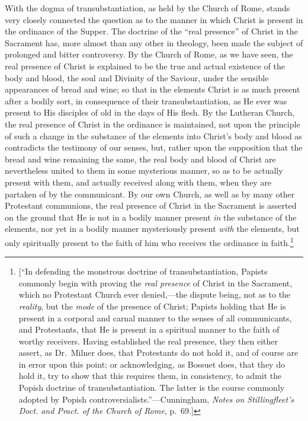 \documentclass[
  english,
]{book}
\begin{document}
With the dogma of transubstantiation, as held by the Church of Rome, stands very closely connected the question as to the manner in which Christ is present in the ordinance of the Supper. The doctrine of the ``real presence'' of Christ in the Sacrament has, more almost than any other in theology, been made the subject of prolonged and bitter controversy. By the Church of Rome, as we have seen, the real presence of Christ is explained to be the true and actual existence of the body and blood, the soul and Divinity of the Saviour, under the sensible appearances of bread and wine; so that in the elements Christ is as much present after a bodily sort, in consequence of their transubstantiation, as He ever was present to His disciples of old in the days of His flesh. By the Lutheran Church, the real presence of Christ in the ordinance is maintained, not upon the principle of such a change in the substance of the elements into Christ's body and blood as contradicts the testimony of our senses, but, rather upon the supposition that the bread and wine remaining the same, the real body and blood of Christ are nevertheless united to them in some mysterious manner, so as to be actually present with them, and actually received along with them, when they are partaken of by the communicant. By our own Church, as well as by many other Protestant communions, the real presence of Christ in the Sacrament is asserted on the ground that He is not in a bodily manner present \emph{in} the substance of the elements, nor yet in a bodily manner mysteriously present \emph{with} the elements, but only spiritually present to the faith of him who receives the ordinance in faith.\footnote{{[}``In defending the monstrous doctrine of transubstantiation, Papists commonly begin with proving the \emph{real presence} of Christ in the Sacrament, which no Protestant Church ever denied,---the dispute being, not as to the \emph{reality}, but the \emph{mode} of the presence of Christ; Papists holding that He is present in a corporal and carnal manner to the senses of all communicants, and Protestants, that He is present in a spiritual manner to the faith of worthy receivers. Having established the real presence, they then either assert, as Dr.~Milner does, that Protestants do not hold it, and of course are in error upon this point; or acknowledging, as Bossuet does, that they do hold it, try to show that this requires them, in consistency, to admit the Popish doctrine of transubstantiation. The latter is the course commonly adopted by Popish controversialists.''---Cunningham, \emph{Notes on Stillingfleet's Doct. and Pract. of the Church of Rome}, p.~69.{]}}
\end{document}

